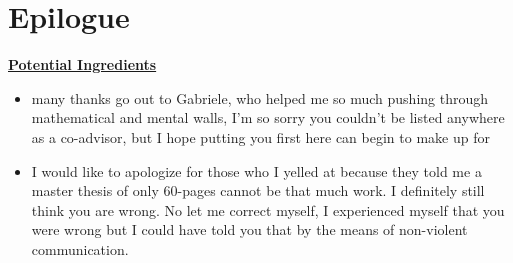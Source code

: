 \documentclass[a4paper, 11pt]{report}
\begin{document}
\chapter{Epilogue}

\underline{\textbf{Potential Ingredients}}

\begin{itemize}
	\item many thanks go out to Gabriele, who helped me so much pushing through mathematical and mental walls, I'm so sorry you couldn't be listed anywhere as a co-advisor, but I hope putting you first here can begin to make up for
	\item I would like to apologize for those who I yelled at because they told me a master thesis of only 60-pages cannot be that much work. I definitely still think you are wrong. No let me correct myself, I experienced myself that you were wrong but I could have told you that by the means of non-violent communication.
\end{itemize}
	

	
\end{document}
